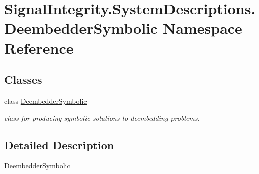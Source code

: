 \hypertarget{namespaceSignalIntegrity_1_1SystemDescriptions_1_1DeembedderSymbolic}{}\section{Signal\+Integrity.\+System\+Descriptions.\+Deembedder\+Symbolic Namespace Reference}
\label{namespaceSignalIntegrity_1_1SystemDescriptions_1_1DeembedderSymbolic}
\subsection*{Classes}
\begin{DoxyCompactItemize}
\item 
class \hyperlink{classSignalIntegrity_1_1SystemDescriptions_1_1DeembedderSymbolic_1_1DeembedderSymbolic}{Deembedder\+Symbolic}
\begin{DoxyCompactList}\small\item\em class for producing symbolic solutions to deembedding problems. \end{DoxyCompactList}\end{DoxyCompactItemize}


\subsection{Detailed Description}
\begin{DoxyVerb}DeembedderSymbolic\end{DoxyVerb}
 